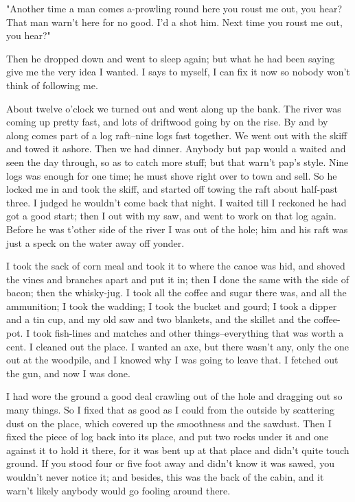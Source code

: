 "Another time a man comes a-prowling round here you roust me out, you
hear? That man warn't here for no good.  I'd a shot him.  Next time you
roust me out, you hear?"

Then he dropped down and went to sleep again; but what he had been saying
give me the very idea I wanted.  I says to myself, I can fix it now so
nobody won't think of following me.

About twelve o'clock we turned out and went along up the bank.  The river
was coming up pretty fast, and lots of driftwood going by on the rise.
By and by along comes part of a log raft--nine logs fast together.  We
went out with the skiff and towed it ashore.  Then we had dinner.
Anybody but pap would a waited and seen the day through, so as to catch
more stuff; but that warn't pap's style.  Nine logs was enough for one
time; he must shove right over to town and sell.  So he locked me in and
took the skiff, and started off towing the raft about half-past three.  I
judged he wouldn't come back that night.  I waited till I reckoned he had
got a good start; then I out with my saw, and went to work on that log
again.  Before he was t'other side of the river I was out of the hole;
him and his raft was just a speck on the water away off yonder.

I took the sack of corn meal and took it to where the canoe was hid, and
shoved the vines and branches apart and put it in; then I done the same
with the side of bacon; then the whisky-jug.  I took all the coffee and
sugar there was, and all the ammunition; I took the wadding; I took the
bucket and gourd; I took a dipper and a tin cup, and my old saw and two
blankets, and the skillet and the coffee-pot.  I took fish-lines and
matches and other things--everything that was worth a cent.  I cleaned
out the place.  I wanted an axe, but there wasn't any, only the one out
at the woodpile, and I knowed why I was going to leave that.  I fetched
out the gun, and now I was done.

I had wore the ground a good deal crawling out of the hole and dragging
out so many things.  So I fixed that as good as I could from the outside
by scattering dust on the place, which covered up the smoothness and the
sawdust.  Then I fixed the piece of log back into its place, and put two
rocks under it and one against it to hold it there, for it was bent up at
that place and didn't quite touch ground.  If you stood four or five foot
away and didn't know it was sawed, you wouldn't never notice it; and
besides, this was the back of the cabin, and it warn't likely anybody
would go fooling around there.

